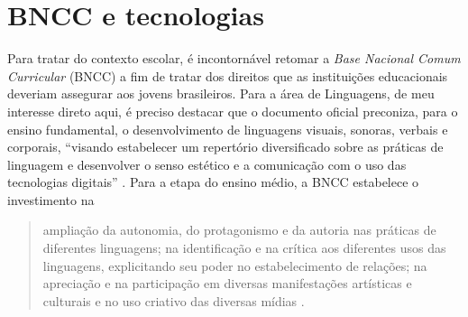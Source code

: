 \documentclass[portuguese]{textolivre}
\begin{document}
\section{BNCC e tecnologias}
Para tratar do contexto escolar, é incontornável retomar a \textit{Base Nacional Comum Curricular} (BNCC) a fim de tratar dos direitos que as instituições educacionais deveriam assegurar aos jovens brasileiros. Para a área de Linguagens, de meu interesse direto aqui, é preciso destacar que o documento oficial preconiza, para o ensino fundamental, o desenvolvimento de linguagens visuais, sonoras, verbais e corporais, ``visando estabelecer um repertório diversificado sobre as práticas de linguagem e desenvolver o senso estético e a comunicação com o uso das tecnologias digitais'' \cite[p. 470]{brasil2018}. Para a etapa do ensino médio, a BNCC estabelece o investimento na

\begin{quote}
    ampliação da autonomia, do protagonismo e da autoria nas práticas de diferentes linguagens; na identificação e na crítica aos diferentes usos das linguagens, explicitando seu poder no estabelecimento de relações; na apreciação e na participação em diversas manifestações artísticas e culturais e no uso criativo das diversas mídias  \cite[p. 470]{brasil2018}.
\end{quote}
\end{document}
